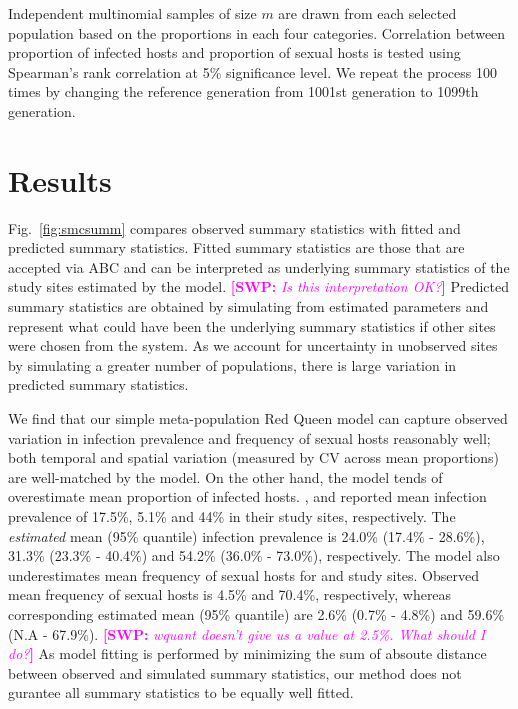 \documentclass{article}\usepackage[]{graphicx}\usepackage[]{color}
\newcommand{\comment}[3]{\textcolor{#1}{\textbf{[#2: }\textit{#3}\textbf{]}}}
\newcommand{\swp}[1]{\comment{magenta}{SWP}{#1}}
\newcommand{\fref}[1]{Fig.~\ref{fig:#1}}
\begin{document}
Independent multinomial samples of size $m$ are drawn from each selected population based on the proportions  in each four categories. 
Correlation between proportion of infected hosts and proportion of sexual hosts is tested using Spearman's rank correlation at 5\% significance level.
We repeat the process 100 times by changing the reference generation from 1001st generation to 1099th generation.

\section{Results}

\fref{smcsumm} compares observed summary statistics with fitted and predicted summary statistics.
Fitted summary statistics are those that are accepted via ABC and can be interpreted as underlying summary statistics of the study sites estimated by the model. \swp{Is this interpretation OK?}
Predicted summary statistics are obtained by simulating from estimated parameters and represent what could have been the underlying summary statistics if other sites were chosen from the system.
As we account for uncertainty in unobserved sites by simulating a greater number of populations, there is large variation in predicted summary statistics.

We find that our simple meta-population Red Queen model can capture observed variation in infection prevalence and frequency of sexual hosts reasonably well;
both temporal and spatial variation (measured by CV across mean proportions) are well-matched by the model. 
On the other hand, the model tends of overestimate mean proportion of infected hosts.
\cite{dagan2013clonal}, \cite{mckone2016fine} and \cite{vergara2014infection} reported mean infection prevalence of 17.5\%, 5.1\% and 44\% in their study sites, respectively.
The \emph{estimated} mean (95\% quantile) infection prevalence is 24.0\% (17.4\% - 28.6\%), 31.3\% (23.3\% - 40.4\%) and 54.2\% (36.0\% - 73.0\%), respectively.
The model also underestimates mean frequency of sexual hosts for \cite{dagan2013clonal} and \cite{vergara2014infection} study sites.
Observed mean frequency of sexual hosts is 4.5\% and 70.4\%, respectively, whereas corresponding estimated mean (95\% quantile) are 2.6\% (0.7\% - 4.8\%) and 59.6\% (N.A - 67.9\%). \swp{wquant doesn't give us a value at 2.5\%. What should I do?}
As model fitting is performed by minimizing the sum of absoute distance between observed and simulated summary statistics, our method does not gurantee all summary statistics to be equally well fitted.
\end{document}

